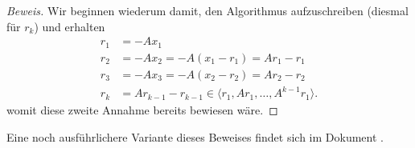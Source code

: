 \begin{proof}[Beweis]
Wir beginnen wiederum damit, den Algorithmus aufzuschreiben (diesmal für $r_k$) und erhalten
\begin{align}
	r_1 &= -Ax_1 \\
	r_2	&= -Ax_2 = -A(x_1-r_1) = Ar_1 - r_1 \nonumber\\
	r_3 &= -Ax_3 = -A(x_2-r_2) = Ar_2 - r_2 \nonumber\\
	r_k &= Ar_{k-1} - r_{k-1} \in \langle r_1, Ar_1, \dots, A^{k-1}r_1 \rangle.
\end{align}
womit diese zweite Annahme bereits bewiesen wäre.
\end{proof}

Eine noch ausführlichere Variante dieses Beweises findet sich im Dokument \cite{cg:online:cgmueller}.

	
